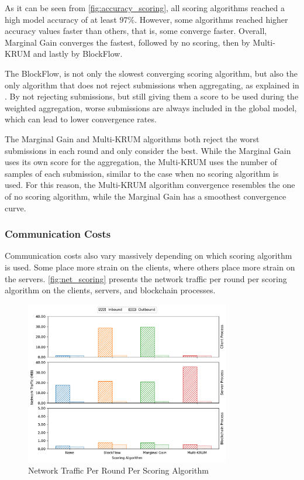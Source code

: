 As it can be seen from \autoref{fig:accuracy_scoring}, all scoring algorithms reached a high model accuracy of at least  $97\%$. However, some algorithms reached higher accuracy values faster than others, that is, some converge faster. Overall, Marginal Gain converges the fastest, followed by no scoring, then by Multi-KRUM and lastly by BlockFlow.

The BlockFlow, is not only the slowest converging scoring algorithm, but also the only algorithm that does not reject submissions when aggregating, as explained in . By not rejecting submissions, but still giving them a score to be used during the weighted aggregation, worse submissions are always included in the global model, which can lead to lower convergence rates. 

The Marginal Gain and Multi-KRUM algorithms both reject the worst submissions in each round and only consider the best. While the Marginal Gain uses its own score for the aggregation, the Multi-KRUM uses the number of samples of each submission, similar to the case when no scoring algorithm is used. For this reason, the Multi-KRUM algorithm convergence resembles the one of no scoring algorithm, while the Marginal Gain has a smoothest convergence curve.

\subsubsection{Communication Costs}

Communication costs also vary massively depending on which  scoring algorithm is used. Some place more strain on the clients, where others place more strain on the servers. \autoref{fig:net_scoring} presents the network traffic per round per scoring algorithm on the clients, servers, and blockchain processes.

\begin{figure}[!ht]
    \centering
    \centering
    \includegraphics[width=0.8\textwidth]{graphics/scoring/net.pdf}
    \caption{Network Traffic Per Round Per Scoring Algorithm}
    \label{fig:net_scoring}
\end{figure}

